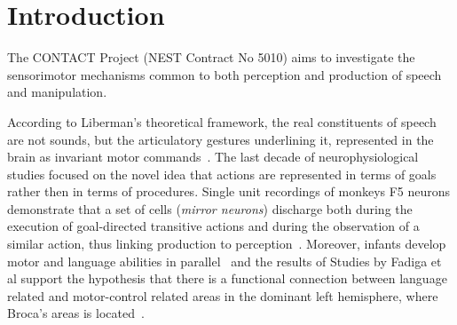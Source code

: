 \chapter{Introduction}
\label{ch:intro}
The CONTACT Project (NEST Contract No 5010) aims to investigate the
sensorimotor mechanisms common to both perception and production of speech and
manipulation.

According to Liberman's theoretical framework,
the real constituents of speech are not sounds, but the articulatory
gestures underlining it, represented in the brain as invariant motor 
commands~\citep{liberman.mattingly:1985}.
The last decade of neurophysiological studies focused on the novel idea that
actions are represented in terms of goals rather then in terms of
procedures. 
Single unit recordings of monkeys F5 neurons demonstrate that a set of cells
(\emph{mirror neurons}) discharge both during the execution of goal-directed 
transitive  actions and during the observation of a similar action, thus 
linking production to perception~\citep{rizzolatti.etal:1988,rizzolatti.etal:1996,rizzolatti.fadiga:1998}. 
Moreover, infants develop motor and language abilities in
parallel~\citep{lennenberg:1967,kandel.schwartz.jessel:2000} and the results of
Studies by Fadiga et al support
%
%
the hypothesis that there is a functional connection between language related
and motor-control related areas in the dominant left
hemisphere, where Broca's areas is located~\citep{fadiga.etal:PRESS}. 


